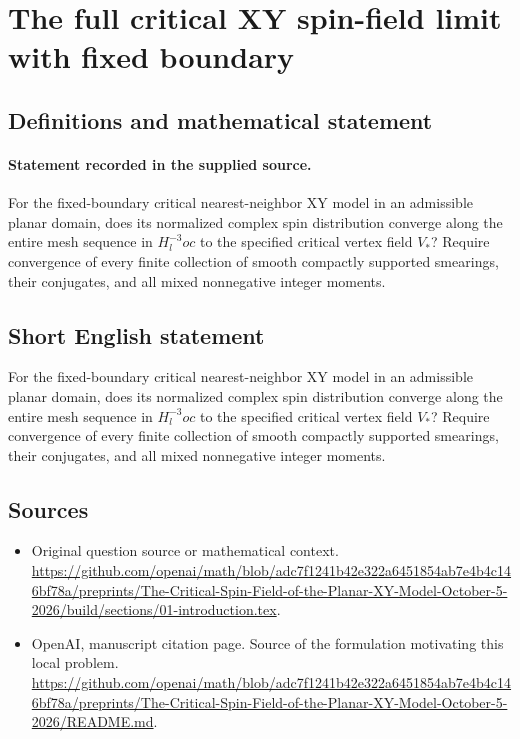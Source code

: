 \documentclass[11pt]{article}
\begin{document}
\section*{The full critical XY spin-field limit with fixed boundary}\label{statement}
\subsection{Definitions and mathematical statement}
\paragraph{Statement recorded in the supplied source.}
For the fixed-boundary critical nearest-neighbor XY model in an admissible planar domain, does its normalized complex spin distribution converge along the entire mesh sequence in $H^{-3}_loc$ to the specified critical vertex field $V_*$? Require convergence of every finite collection of smooth compactly supported smearings, their conjugates, and all mixed nonnegative integer moments.
\subsection{Short English statement}
For the fixed-boundary critical nearest-neighbor XY model in an admissible planar domain, does its normalized complex spin distribution converge along the entire mesh sequence in $H^{-3}_loc$ to the specified critical vertex field $V_*$? Require convergence of every finite collection of smooth compactly supported smearings, their conjugates, and all mixed nonnegative integer moments.
\subsection{Sources}
\begin{itemize}
\item[S1] Original question source or mathematical context.
\url{https://github.com/openai/math/blob/adc7f1241b42e322a6451854ab7e4b4c146bf78a/preprints/The-Critical-Spin-Field-of-the-Planar-XY-Model-October-5-2026/build/sections/01-introduction.tex}.
\item[S2] OpenAI, manuscript citation page. Source of the formulation motivating this local problem.
\url{https://github.com/openai/math/blob/adc7f1241b42e322a6451854ab7e4b4c146bf78a/preprints/The-Critical-Spin-Field-of-the-Planar-XY-Model-October-5-2026/README.md}.
\end{itemize}
\end{document}
